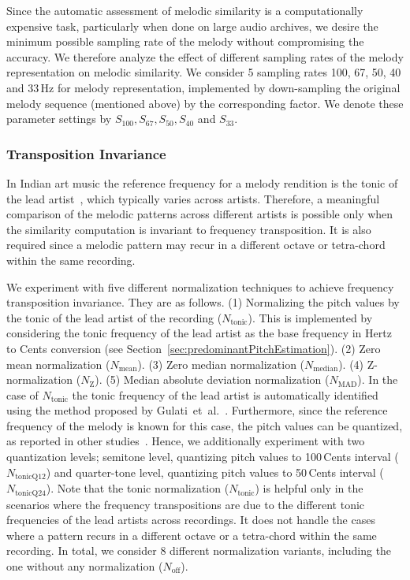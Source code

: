 Since the automatic assessment of melodic similarity is a computationally expensive task, particularly when done on large audio archives, we desire the minimum possible sampling rate of the melody without compromising the accuracy. We therefore analyze the effect of different sampling rates of the melody representation on melodic similarity. We consider 5 sampling rates 100, 67, 50, 40 and 33\,Hz for melody representation, implemented by down-sampling the original melody sequence (mentioned above) by the corresponding factor. We denote these parameter settings by $S_{100}, S_{67}, S_{50}, S_{40}$ and $S_{33}$.

\subsubsection{Transposition Invariance}

In Indian art music the reference frequency for a melody rendition is the tonic of the lead artist~\cite{Gulati2014Tonic}, which typically varies across artists. Therefore, a meaningful comparison of the melodic patterns across different artists is possible only when the similarity computation is invariant to frequency transposition. It is also required since a melodic pattern may recur in a different octave or tetra-chord within the same recording. 

We experiment with five different normalization techniques to achieve frequency transposition invariance. They are as follows. (1) Normalizing the pitch values by the tonic of the lead artist of the recording ($N_{\mathrm{tonic}}$). This is implemented by considering the tonic frequency of the lead artist as the base frequency in Hertz to Cents conversion (see Section~\ref{sec:predominantPitchEstimation}). (2) Zero mean normalization ($N_{\mathrm{mean}}$). (3) Zero median normalization ($N_{\mathrm{median}}$). (4) Z-normalization ($N_{\mathrm{Z}}$). (5) Median absolute deviation normalization ($N_{\mathrm{MAD}}$). In the case of $N_{\mathrm{tonic}}$ the tonic frequency of the lead artist is automatically identified using the method proposed by Gulati~et~al.~\cite{Gulati2014Tonic}. Furthermore, since the reference frequency of the melody is known for this case, the pitch values can be quantized, as reported in other studies~\cite{Ross2012b}. Hence, we additionally experiment with two quantization levels; semitone level, quantizing pitch values to 100\,Cents interval ($N_{\mathrm{tonicQ12}}$) and quarter-tone level,  quantizing pitch values to 50\,Cents interval ($N_{\mathrm{tonicQ24}}$). Note that the tonic normalization ($N_{\mathrm{tonic}}$) is helpful only in the scenarios where the frequency transpositions are due to the different tonic frequencies of the lead artists across recordings. It does not handle the cases where a pattern recurs in a different octave or a tetra-chord within the same recording. In total, we consider 8 different normalization variants, including the one without any normalization ($N_{\mathrm{off}}$). 

